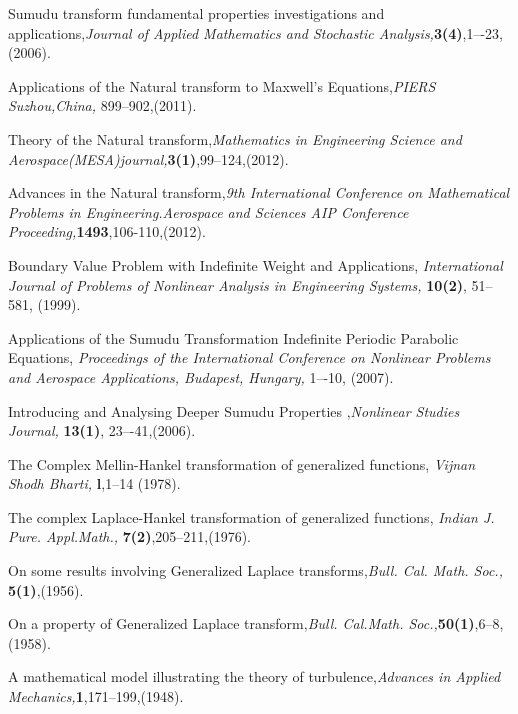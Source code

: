 \begin{thebibliography}{00}
 Sumudu transform fundamental properties investigations and applications,{\it Journal of Applied Mathematics and Stochastic Analysis,}{\bf 3(4)},1–-23,(2006).

Applications of the Natural transform to Maxwell's Equations,{\it PIERS Suzhou,China,} 899--902,(2011).

Theory of the Natural transform,{\it Mathematics in Engineering Science and Aerospace(MESA)journal,}{\bf 3(1)},99--124,(2012).

 Advances in the Natural transform,{\it 9th International Conference on Mathematical Problems in Engineering.Aerospace and Sciences AIP Conference Proceeding,}{\bf 1493},106-110,(2012).

Boundary Value Problem with Indefinite Weight and Applications,
{\it International Journal of Problems of Nonlinear Analysis in Engineering Systems,}
{\bf 10(2)}, 51--581, (1999).

Applications of the Sumudu Transformation Indefinite Periodic Parabolic Equations, {\it Proceedings of the International Conference on Nonlinear Problems and Aerospace Applications, Budapest, Hungary,} 1–-10, (2007).

Introducing and Analysing Deeper Sumudu Properties ,{\it Nonlinear Studies Journal,} {\bf 13(1)}, 23–-41,(2006).


 The Complex Mellin-Hankel transformation of generalized functions, {\it Vijnan Shodh Bharti,} {\bf l},1--14 (1978).

 The complex Laplace-Hankel transformation of generalized functions, {\it Indian J. Pure. Appl.Math.,} {\bf 7(2)},205--211,(1976).

 On some results involving Generalized Laplace transforms,{\it Bull. Cal. Math. Soc.,} {\bf 5(1)},(1956).

On a property of Generalized Laplace transform,{\it Bull. Cal.Math. Soc.,}{\bf 50(1)},6--8,(1958).

A mathematical model illustrating the theory of turbulence,{\it Advances in Applied Mechanics,}{\bf 1},171--199,(1948).


\end{thebibliography}

